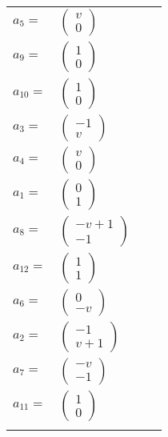 \documentclass[1p]{elsarticle_modified}
\theoremstyle{definition}
\begin{document}
\begin{tabular}{m{7pt} m{180pt} m{7pt} m{180pt} }
\flushright $a_{5}=$&$\begin{pmatrix}v\\0\end{pmatrix}$ \\
\flushright $a_{9}=$&$\begin{pmatrix}1\\0\end{pmatrix}$ \\
\flushright $a_{10}=$&$\begin{pmatrix}1\\0\end{pmatrix}$ \\
\flushright $a_{3}=$&$\begin{pmatrix}-1\\v\end{pmatrix}$ \\
\flushright $a_{4}=$&$\begin{pmatrix}v\\0\end{pmatrix}$ \\
\flushright $a_{1}=$&$\begin{pmatrix}0\\1\end{pmatrix}$ \\
\flushright $a_{8}=$&$\begin{pmatrix}- v+1\\-1\end{pmatrix}$ \\
\flushright $a_{12}=$&$\begin{pmatrix}1\\1\end{pmatrix}$ \\
\flushright $a_{6}=$&$\begin{pmatrix}0\\- v\end{pmatrix}$ \\
\flushright $a_{2}=$&$\begin{pmatrix}-1\\v+1\end{pmatrix}$ \\
\flushright $a_{7}=$&$\begin{pmatrix}- v\\-1\end{pmatrix}$ \\
\flushright $a_{11}=$&$\begin{pmatrix}1\\0\end{pmatrix}$\\&\end{tabular}
\end{document}

